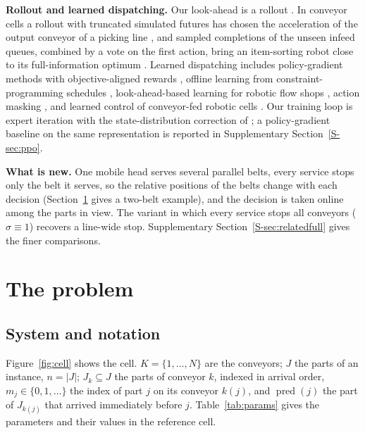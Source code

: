 \documentclass[11pt,a4paper]{article}
\theoremstyle{plain}
\theoremstyle{definition}
\theoremstyle{remark}
\newcommand{\pred}{\operatorname{pred}}
\newcommand{\Supp}[1]{Supplementary Section~\ref{S-#1}}
\begin{document}
\textbf{Rollout and learned dispatching.} Our look-ahead is a rollout
\cite{M02_Bertsekas1997}. In conveyor cells a rollout with truncated simulated futures has
chosen the acceleration of the output conveyor of a picking line \cite{Righettini2025}, and
sampled completions of the unseen infeed queues, combined by a vote on the first action,
bring an item-sorting robot close to its full-information optimum \cite{Li2026}. Learned
dispatching includes policy-gradient methods with objective-aligned rewards
\cite{S19_Zhang2020,S21_Sun2023}, offline learning from constraint-programming schedules
\cite{S20_VanRemmerden2025}, look-ahead-based learning for robotic flow shops
\cite{S14_Kim2023}, action masking \cite{M04_Huang2022,S18_Wei2024}, and learned control of
conveyor-fed robotic cells \cite{S15_Zisgen2025,S16_Drijver2023,S17_Drakaki2017,S12_Wang2004,S13_Li2020}.
Our training loop is expert iteration \cite{Anthony2017,Silver2018} with the
state-distribution correction of \cite{Ross2011}; a policy-gradient baseline
\cite{Schulman2017} on the same representation is reported in \Supp{sec:ppo}.

\textbf{What is new.} One mobile head serves several parallel belts, every service stops
only the belt it serves, so the relative positions of the belts change with each decision
(Section~\ref{sec:problem} gives a two-belt example), and the decision is taken online
among the parts in view. The variant in which every service stops all conveyors
($\sigma\equiv1$) recovers a line-wide stop. \Supp{sec:relatedfull} gives the finer
comparisons.

\section{The problem}\label{sec:problem}
\subsection{System and notation}
Figure~\ref{fig:cell} shows the cell. $K=\{1,\dots,N\}$ are the conveyors; $J$ the parts of
an instance, $n=|J|$; $J_k\subseteq J$ the parts of conveyor $k$, indexed in arrival order,
$m_j\in\{0,1,\dots\}$ the index of part $j$ on its conveyor $k(j)$, and $\pred(j)$ the part
of $J_{k(j)}$ that arrived immediately before $j$. Table~\ref{tab:params} gives the
parameters and their values in the reference cell.
\end{document}
